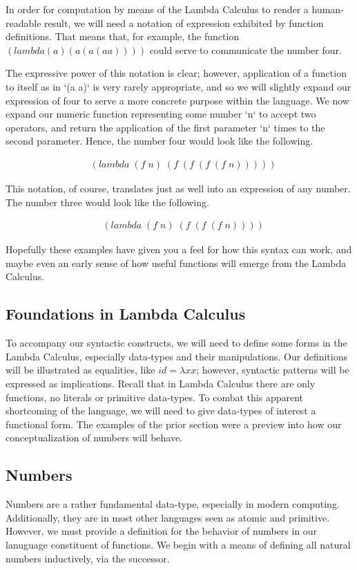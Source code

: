 \documentclass[11pt]{article}
\begin{document}
In order for computation by means of the Lambda Calculus to render a human-readable result, we will need a notation of expression exhibited by function definitions. That means that, for example, the function $(lambda (a) (a (a (a a))))$ could serve to communicate the number four.

The expressive power of this notation is clear; however, application of a function to itself as in `(a a)` is very rarely appropriate, and so we will slightly expand our expression of four to serve a more concrete purpose within the language. We now expand our numeric function representing some number `n` to accept two operators, and return the application of the first parameter `n` times to the second parameter. Hence, the number four would look like the following.

\begin{align*}
& (lambda \; (f \; n) \; (f \; (f \; (f \; (f \; n)))))
\end{align*}

This notation, of course, translates just as well into an expression of any number. The number three would look like the following.

\begin{align*}
& (lambda \; (f \; n) \; (f \; (f \; (f \; n))))
\end{align*}

Hopefully these examples have given you a feel for how this syntax can work, and maybe even an early sense of how useful functions will emerge from the Lambda Calculus.

\subsection{Foundations in Lambda Calculus}
To accompany our syntactic constructs, we will need to define some forms in the Lambda Calculus, especially data-types and their manipulations. Our definitions will be illustrated as equalities, like $id = \lambda xx$; however, syntactic patterns will be expressed as implications. Recall that in Lambda Calculus there are only functions, no literals or primitive data-types. To combat this apparent shortcoming of the language, we will need to give data-types of interest a functional form. The examples of the prior section were a preview into how our conceptualization of numbers will behave.

\subsection{Numbers}
Numbers are a rather fundamental data-type, especially in modern computing. Additionally, they are in most other languages seen as atomic and primitive. However, we must provide a definition for the behavior of numbers in our lanuguage constituent of functions. We begin with a means of defining all natural numbers inductively, via the successor.
\end{document}
